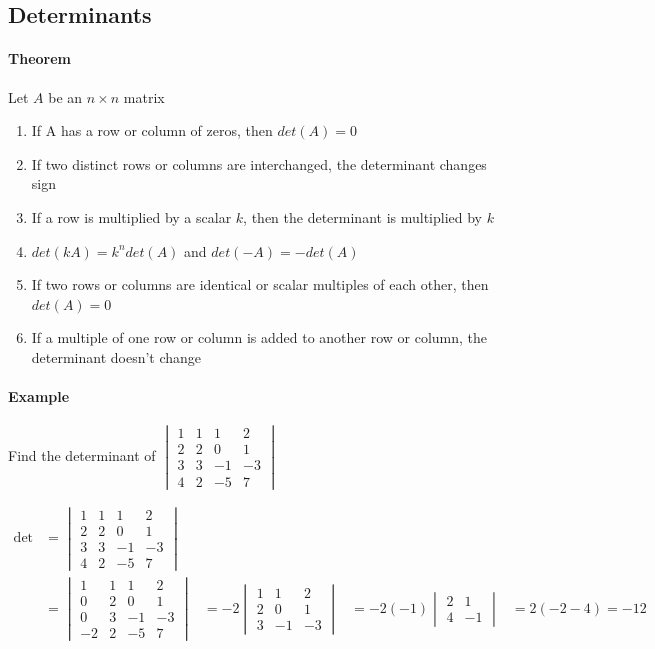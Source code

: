 \subsection{Determinants}


\paragraph*{Theorem}
Let $A$ be an $n \times n$ matrix
\begin{enumerate}
    \item If A has a row or column of zeros, then $det(A) = 0$
    \item If two distinct rows or columns are interchanged, the determinant changes sign
    \item If a row is multiplied by a scalar $k$, then the determinant is multiplied by $k$
    \item $det(kA) = k^n det(A)$ and $det(-A) = -det(A)$
    \item If two rows or columns are identical or scalar multiples of each other, then $det(A) = 0$
    \item If a multiple of one row or column is added to another row or column, the determinant doesn't change
\end{enumerate}

\paragraph*{Example}
Find the determinant of $\begin{vmatrix}
    1 & 1 & 1 & 2 \\
    2 & 2 & 0 & 1 \\
    3 & 3 & -1 & -3 \\
    4 & 2 & -5 & 7
\end{vmatrix}$

\begin{align*}
    \text{det} &= \begin{vmatrix}
        1 & 1 & 1 & 2 \\
        2 & 2 & 0 & 1 \\
        3 & 3 & -1 & -3 \\
        4 & 2 & -5 & 7
    \end{vmatrix} \\
       &= \begin{vmatrix}
        1 & 1 & 1 & 2 \\
        0 & 2 & 0 & 1 \\
        0 & 3 & -1 & -3 \\
        -2 & 2 & -5 & 7
    \end{vmatrix}
    &= -2 \begin{vmatrix}
        1 & 1 & 2 \\
        2 & 0 & 1 \\
        3 & -1 & -3
    \end{vmatrix}
    &= -2 (-1) \begin{vmatrix}
        2 & 1 \\
        4 & -1
    \end{vmatrix}
    &= 2(-2-4) = -12
\end{align*}

